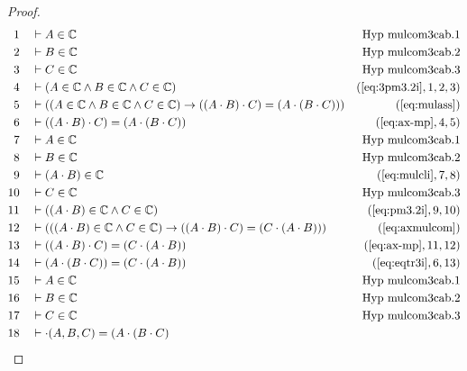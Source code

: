 \begin{proof}
\begin{align}
  1 &&  & \vdash A \in \mathbb{C}&\text{Hyp~mulcom3cab.1}\notag%
  \\ 2 &&  & \vdash B \in
\mathbb{C}&\text{Hyp~mulcom3cab.2}\notag%
  \\ 3 &&  & \vdash C \in
\mathbb{C}&\text{Hyp~mulcom3cab.3}\notag%
  \\ 4 &&  & \vdash ( A \in \mathbb{C} \wedge B \in \mathbb{C} \wedge C \in
     \mathbb{C} )&(\mbox{\ref{eq:3pm3.2i}},1,2,3)\notag
  \\ 5 &&  & \vdash ( ( A \in \mathbb{C} \wedge B \in \mathbb{C} \wedge C \in
     \mathbb{C} ) \rightarrow ( ( A \cdot B ) \cdot C ) =
     ( A \cdot ( B \cdot C ) )
     )&(\mbox{\ref{eq:mulass}})\notag
  \\ 6 &&  & \vdash ( ( A \cdot B ) \cdot C ) = ( A \cdot ( B \cdot C )
     )&(\mbox{\ref{eq:ax-mp}},4,5)\notag
  \\ 7 &&  & \vdash A \in
\mathbb{C}&\text{Hyp~mulcom3cab.1}\notag%
  \\ 8 &&  & \vdash B \in
\mathbb{C}&\text{Hyp~mulcom3cab.2}\notag%
  \\ 9 &&  & \vdash ( A \cdot B ) \in
     \mathbb{C}&(\mbox{\ref{eq:mulcli}},7,8)\notag
  \\ 10 &&  & \vdash C \in
\mathbb{C}&\text{Hyp~mulcom3cab.3}\notag%
  \\ 11 &&  & \vdash ( ( A \cdot B ) \in \mathbb{C} \wedge C \in \mathbb{C}
     )&(\mbox{\ref{eq:pm3.2i}},9,10)\notag
  \\ 12 &&  & \vdash ( ( ( A \cdot B ) \in \mathbb{C} \wedge C \in \mathbb{C} )
     \rightarrow ( ( A \cdot B ) \cdot C ) = ( C \cdot ( A
     \cdot B ) ) )&(\mbox{\ref{eq:axmulcom}})\notag
  \\ 13 &&  & \vdash ( ( A \cdot B ) \cdot C ) = ( C \cdot ( A \cdot B )
     )&(\mbox{\ref{eq:ax-mp}},11,12)\notag
  \\ 14 &&  & \vdash ( A \cdot ( B \cdot C ) ) = ( C \cdot ( A \cdot B )
     )&(\mbox{\ref{eq:eqtr3i}},6,13)\notag
  \\ 15 &&  & \vdash A \in
\mathbb{C}&\text{Hyp~mulcom3cab.1}\notag%
  \\ 16 &&  & \vdash B \in
\mathbb{C}&\text{Hyp~mulcom3cab.2}\notag%
  \\ 17 &&  & \vdash C \in
\mathbb{C}&\text{Hyp~mulcom3cab.3}\notag%
  \\ 18 &&  & \vdash \cdot( A , B , C ) = ( A \cdot ( B \cdot C )

\end{align}
\end{proof}
